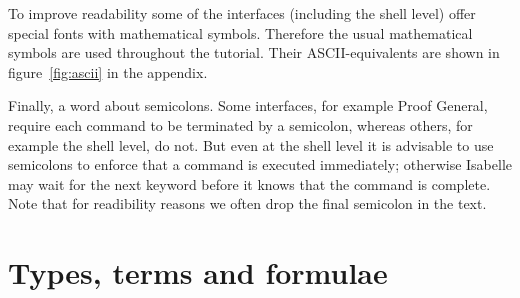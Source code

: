 To improve readability some of the interfaces (including the shell level)
offer special fonts with mathematical symbols. Therefore the usual
mathematical symbols are used throughout the tutorial. Their
ASCII-equivalents are shown in figure~\ref{fig:ascii} in the appendix.

Finally, a word about semicolons. Some interfaces,
for example Proof General, require each command to be terminated by a
semicolon, whereas others, for example the shell level, do not. But even at
the shell level it is advisable to use semicolons to enforce that a command
is executed immediately; otherwise Isabelle may wait for the next keyword
before it knows that the command is complete. Note that for readibility
reasons we often drop the final semicolon in the text.


\section{Types, terms and formulae}
\label{sec:TypesTermsForms}

